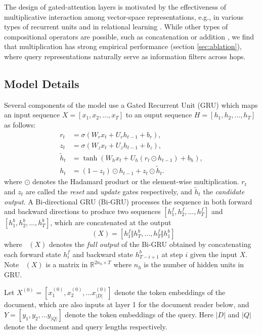 \documentclass[11pt,a4paper]{article}
\DeclareMathOperator{\bigru}{\overset{\longleftrightarrow}{\mathrm{GRU}}}
\begin{document}
The design of gated-attention layers is motivated by the effectiveness of multiplicative interaction
among vector-space representations,
e.g., in various types of recurrent units \citep{hochreiter1997long, wu2016multiplicative} and in relational learning \citep{yang2014learning, kiros2014multiplicative}.
While other types of compositional operators are possible,
such as concatenation or addition \citep{mitchell2008vector},
we find that multiplication has strong empirical performance
(section \ref{sec:ablation}),
where query representations naturally serve as information filters
across hops.


\subsection{Model Details}
\label{sec:model-details}
Several components of the model use a Gated Recurrent Unit (GRU) \citep{cho2014learning} which maps an input sequence $X = [x_1,x_2,\ldots,x_T]$ to an ouput sequence $H=[h_1,h_2,\ldots,h_T]$ as follows:
\begin{align*}
r_t &= \sigma (W_r x_t + U_r h_{t-1} + b_r), \\
z_t &= \sigma (W_z x_t + U_z h_{t-1} + b_z), \\
\tilde{h}_t &= \tanh(W_h x_t + U_h (r_t \odot h_{t-1}) + b_h), \\
h_t &= (1-z_t) \odot h_{t-1} + z_t \odot \tilde{h}_t.
\end{align*}
where $\odot$ denotes the Hadamard product or the element-wise multiplication.
$r_t$ and $z_t$ are called the \textit{reset} and \textit{update} gates respectively, and $\tilde{h}_t$ the \textit{candidate output}. 
A Bi-directional GRU (Bi-GRU) processes the sequence in both forward and backward directions to produce two sequences $[h_1^f, h_2^f, \dots, h_T^f ]$ and $[ h_1^b, h_2^b, \dots, h_T^b ]$, which are concatenated at the output
\begin{equation}
    \bigru(X) = [h^f_1 \Vert h^b_T,\ldots,h^f_T \Vert h^b_1]
\end{equation}
where $\bigru(X)$ denotes the \textit{full output} of the Bi-GRU obtained by concatenating each forward state $h^f_i$ and backward state $h^b_{T-i+1}$ at step $i$ given the input $X$. Note $\bigru(X)$ is a matrix in $\mathbb{R}^{2n_h \times T}$ where $n_h$ is the number of hidden units in GRU.

Let $X^{(0)} = [x_1^{(0)},x_2^{(0)},\ldots x_{|D|}^{(0)}]$ denote the token embeddings of the document, which are also inputs at layer 1 for the document reader below, and $Y = [y_1,y_2,\ldots y_{|Q|}]$ denote the token embeddings of the query. Here $|D|$ and $|Q|$ denote the document and query lengths respectively.
\end{document}

